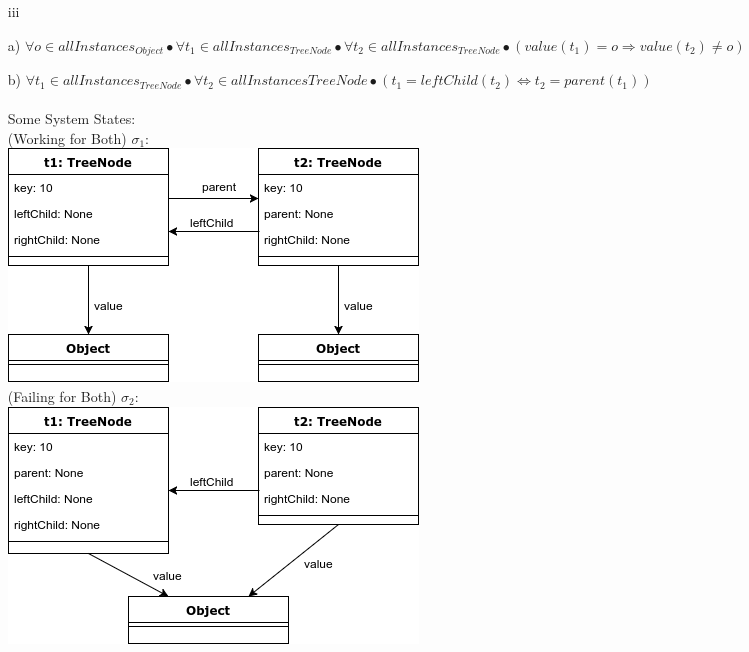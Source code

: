 \documentclass{scrartcl}
\begin{document}
\begin{itemize}
    \item[iii]
    \item[a)] $ \forall o \in allInstances_{Object} \bullet \forall t_1 \in allInstances_{TreeNode} \bullet \forall t_2 \in allInstances_{TreeNode} \bullet (value(t_1) = o \Rightarrow value(t_2) \neq o)$ \\
    \item[b)] $ \forall t_1 \in allInstances_{TreeNode} \bullet \forall t_2 \in allInstances{TreeNode} \bullet (t_1 = leftChild(t_2) \Leftrightarrow t_2 = parent(t_1))$ \\ \\
        Some System States: \\
        \newpage
        (Working for Both) $\sigma_1:$ \\
        \includegraphics[width=\textwidth]{Working.png} \\
        (Failing for Both) $\sigma_2:$ \\
        \includegraphics[width=\textwidth]{Failing.png} \\

\end{itemize}
\end{document}
